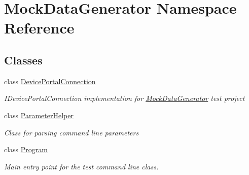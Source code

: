 \hypertarget{namespace_mock_data_generator}{}\section{Mock\+Data\+Generator Namespace Reference}
\label{namespace_mock_data_generator}
\subsection*{Classes}
\begin{DoxyCompactItemize}
\item 
class \hyperlink{class_mock_data_generator_1_1_device_portal_connection}{Device\+Portal\+Connection}
\begin{DoxyCompactList}\small\item\em I\+Device\+Portal\+Connection implementation for \hyperlink{namespace_mock_data_generator}{Mock\+Data\+Generator} test project \end{DoxyCompactList}\item 
class \hyperlink{class_mock_data_generator_1_1_parameter_helper}{Parameter\+Helper}
\begin{DoxyCompactList}\small\item\em Class for parsing command line parameters \end{DoxyCompactList}\item 
class \hyperlink{class_mock_data_generator_1_1_program}{Program}
\begin{DoxyCompactList}\small\item\em Main entry point for the test command line class. \end{DoxyCompactList}\end{DoxyCompactItemize}
